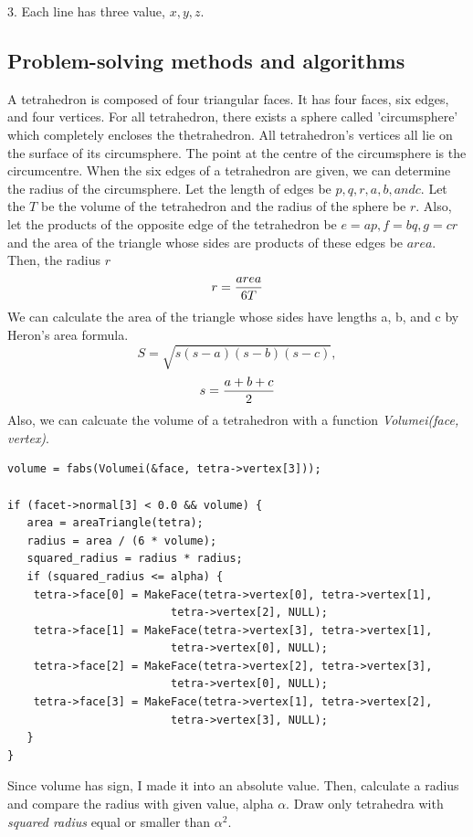 \documentclass[11pt]{article}
\begin{document}
3. Each line has three value, $x, y, z$.

\clearpage

\subsection{Problem-solving methods and algorithms}
A tetrahedron is composed of four triangular faces. It has four faces, six edges, and four vertices. For all tetrahedron, there exists a sphere called 'circumsphere' which completely encloses the thetrahedron. All tetrahedron's vertices all lie on the surface of its circumsphere. The point at the centre of the circumsphere is the circumcentre. When the six edges of a tetrahedron are given, we can determine the radius of the circumsphere. Let the length of edges be $p, q, r, a, b, and c$. Let the $T$ be the volume of the tetrahedron and the radius of the sphere be $r$. Also, let the products of the opposite edge of the tetrahedron be $e = ap, f=bq, g = cr$ and the area of the triangle whose sides are products of these edges be $area$. Then, the radius $r$
\begin{equation*}
r = {area\over 6T}
\end{equation*}
We can calculate the area of the triangle whose sides have lengths a, b, and c by Heron's area formula.
\begin{equation*}
S = \sqrt{s(s-a)(s-b)(s-c)},
\end{equation*}
\begin{equation*}
s = {a + b + c \over 2}
\end{equation*}
Also, we can calcuate the volume of a tetrahedron with a function \textit{ Volumei(face, vertex)}.

\begin{lstlisting}
volume = fabs(Volumei(&face, tetra->vertex[3]));
	
if (facet->normal[3] < 0.0 && volume) {
   area = areaTriangle(tetra);
   radius = area / (6 * volume);
   squared_radius = radius * radius;		
   if (squared_radius <= alpha) {
	tetra->face[0] = MakeFace(tetra->vertex[0], tetra->vertex[1],
						 tetra->vertex[2], NULL);
	tetra->face[1] = MakeFace(tetra->vertex[3], tetra->vertex[1],
						 tetra->vertex[0], NULL);
	tetra->face[2] = MakeFace(tetra->vertex[2], tetra->vertex[3],
						 tetra->vertex[0], NULL);
	tetra->face[3] = MakeFace(tetra->vertex[1], tetra->vertex[2],
						 tetra->vertex[3], NULL);
   }
}

\end{lstlisting}
Since volume has sign, I made it into an absolute value. Then, calculate a radius and compare the radius with given value, alpha $\alpha$. Draw only tetrahedra with \textit{squared radius} equal or smaller than $\alpha^2$.
\end{document}
